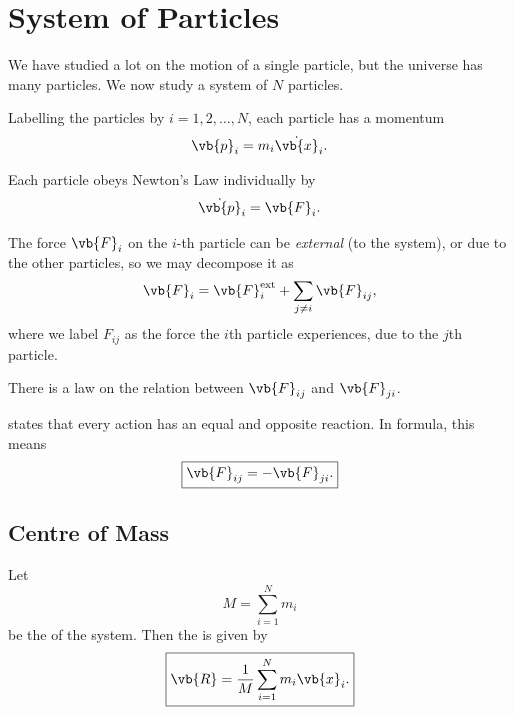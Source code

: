 \section{System of Particles}

We have studied a lot on the motion of a single particle, but the universe has many particles. We now study a system of \(N\) particles.

Labelling the particles by \(i = 1, 2, \ldots, N\), each particle has a momentum
\begin{equation}
    \vb{p}_i = m_i \dot{\vb{x}}_i.
\end{equation}

Each particle obeys Newton's Law individually by
\begin{equation}
    \dot{\vb{p}}_i = \vb{F}_i.
\end{equation}

The force \(\vb{F}_i\) on the \(i\)-th particle can be \emph{external} (to the system), or due to the other particles, so we may decompose it as
\begin{equation}
    \vb{F}_i = \vb{F}_i^{\text{ext}} + \sum_{j \neq i} \vb{F}_{ij},
\end{equation}
where we label \(F_{ij}\) as the force the \(i\)th particle experiences, due to the \(j\)th particle.

There is a law on the relation between \(\vb{F}_{ij}\) and \(\vb{F}_{ji}\).

\begin{theorem}
     states that every action has an equal and opposite reaction. In formula, this means
    \begin{equation}
        \boxed{\vb{F}_{ij} = - \vb{F}_{ji}.}
    \end{equation}
\end{theorem}

\subsection{Centre of Mass}

\begin{definition}
    Let
    \begin{equation}
        M = \sum_{i = 1}^{N} m_i
    \end{equation}
    be the  of the system. Then the  is given by
    \begin{equation}
        \boxed{\vb{R} = \frac{1}{M} \sum_{i = 1}^{N} m_i \vb{x}_i.}
    \end{equation}
\end{definition}

